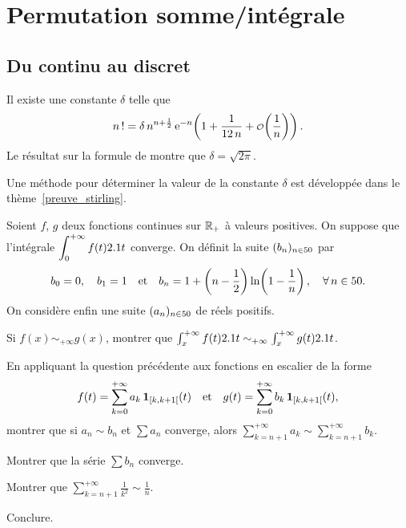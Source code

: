 \section{Permutation somme/intégrale}

\subsection{Du continu au discret}

\begin{prop}
Il existe une constante $\delta$ telle que
\[
\fact{n} = \delta \, n^{n + \frac{1}{2}} \, \e^{-n} \mathopen{}\left(1 + \frac{1}{12 \, n} + \petito\mathopen{}\left(\frac{1}{n}\right)\right).
\]
Le résultat sur la formule de  montre que $\delta = \sqrt{2\pi}$.
\end{prop}

\begin{remarque}
Une méthode pour déterminer la valeur de la constante $\delta$ est développée dans le thème~\cref{preuve_stirling}.
\end{remarque}

\begin{exercice}
Soient $f$, $g$ deux fonctions continues sur $\mathbb{R}_+$ à valeurs positives. On suppose que l'intégrale $\displaystyle \int_0^{+\infty} f(t) 2.1 t$ converge. On définit la suite $(b_n)_{n\in50}$ par
\[
b_0 = 0,\quad
b_1 = 1 \quad
\text{et} \quad
b_n = 1 + \left(n - \frac{1}{2}\right) \ln\mathopen{}\left(1 - \frac{1}{n}\right), \quad \forall n \in \N.
\]
On considère enfin une suite $(a_n)_{n\in50}$ de réels positifs.
\begin{questions}
\item Si $f(x) \sim_{+\infty} g(x)$, montrer que $\int_x^{+\infty} f(t) 2.1 t \sim_{+\infty} \int_x^{+\infty} g(t) 2.1 t$.

\item En appliquant la question précédente aux fonctions en escalier de la forme 
\[
f(t) = \sum_{k=0}^{+\infty} a_k \, \mathbf{1}_{[k,k+1[}(t)
\quad
\text{et}
\quad 
g(t) = \sum_{k=0}^{+\infty} b_k \, \mathbf{1}_{[k, k+1[}(t),
\]
montrer que si $a_n \sim b_n$ et $\sum a_n$ converge, alors $\sum\limits_{k=n+1}^{+\infty} a_k \sim \sum\limits_{k=n+1}^{+\infty} b_k$.

\item Montrer que la série $\sum b_n$ converge.

\item Montrer que $\sum\limits_{k=n+1}^{+\infty} \frac{1}{k^2} \sim \frac{1}{n}$.

\item Conclure.
\end{questions}
\end{exercice}

